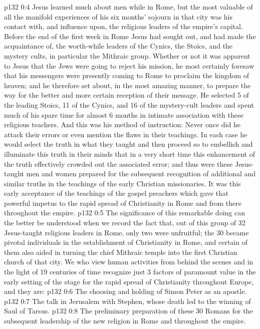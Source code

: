 \vs p132 0:4 Jesus learned much about men while in Rome, but the most valuable of all the manifold experiences of his six months’ sojourn in that city was his contact with, and influence upon, the religious leaders of the empire’s capital. Before the end of the first week in Rome Jesus had sought out, and had made the acquaintance of, the worth\hyp{}while leaders of the Cynics, the Stoics, and the mystery cults, in particular the Mithraic group. Whether or not it was apparent to Jesus that the Jews were going to reject his mission, he most certainly foresaw that his messengers were presently coming to Rome to proclaim the kingdom of heaven; and he therefore set about, in the most amazing manner, to prepare the way for the better and more certain reception of their message. He selected 5 of the leading Stoics, 11 of the Cynics, and 16 of the mystery\hyp{}cult leaders and spent much of his spare time for almost 6 months in intimate association with these religious teachers. And this was his method of instruction: Never once did he attack their errors or even mention the flaws in their teachings. In each case he would select the truth in what they taught and then proceed so to embellish and illuminate this truth in their minds that in a very short time this enhancement of the truth effectively crowded out the associated error; and thus were these Jesus\hyp{}taught men and women prepared for the subsequent recognition of additional and similar truths in the teachings of the early Christian missionaries. It was this early acceptance of the teachings of the gospel preachers which gave that powerful impetus to the rapid spread of Christianity in Rome and from there throughout the empire.
\vs p132 0:5 The significance of this remarkable doing can the better be understood when we record the fact that, out of this group of 32 Jesus\hyp{}taught religious leaders in Rome, only two were unfruitful; the 30 became pivotal individuals in the establishment of Christianity in Rome, and certain of them also aided in turning the chief Mithraic temple into the first Christian church of that city. We who view human activities from behind the scenes and in the light of 19 centuries of time recognize just 3 factors of paramount value in the early setting of the stage for the rapid spread of Christianity throughout Europe, and they are:
\vs p132 0:6 \bibnobreakspace The choosing and holding of Simon Peter as an apostle.
\vs p132 0:7 \bibnobreakspace The talk in Jerusalem with Stephen, whose death led to the winning of Saul of Tarsus.
\vs p132 0:8 \bibnobreakspace The preliminary preparation of these 30 Romans for the subsequent leadership of the new religion in Rome and throughout the empire.
